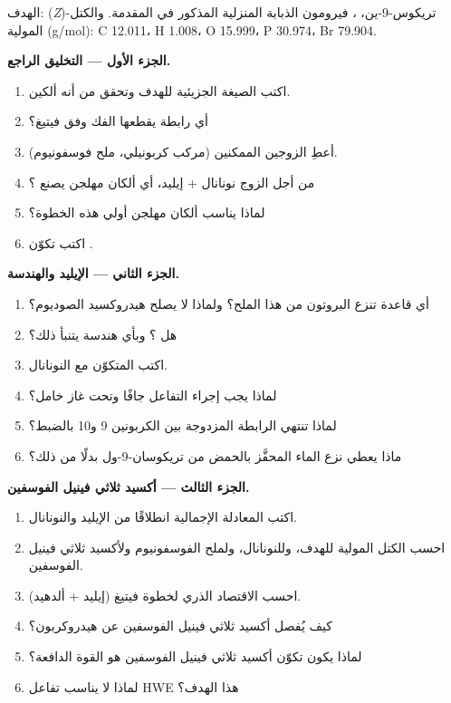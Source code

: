 \begin{problem}
\label{pb:b2:wittig:1}
الهدف: (\textit{Z})-تريكوس-9-ين، ، فيرومون الذبابة المنزلية المذكور في
المقدمة. والكتل المولية (\unit{g/mol}): C 12.011، H 1.008، O 15.999، P 30.974، Br 79.904.

\medskip
\noindent\textbf{الجزء الأول --- التخليق الراجع.}
\begin{enumerate}
  \item اكتب الصيغة الجزيئية للهدف وتحقق من أنه ألكين.
  \item أي رابطة يقطعها الفك وفق فيتيغ؟
  \item أعطِ الزوجين الممكنين (مركب كربونيلي، ملح فوسفونيوم).
  \item من أجل الزوج نونانال + إيليد، أي ألكان مهلجن يصنع ؟
  \item لماذا يناسب ألكان مهلجن أولي هذه الخطوة؟
  \item اكتب تكوّن .
\end{enumerate}

\medskip
\noindent\textbf{الجزء الثاني --- الإيليد والهندسة.}
\begin{enumerate}[resume]
  \item أي قاعدة تنزع البروتون من هذا الملح؟ ولماذا لا يصلح هيدروكسيد الصوديوم؟
  \item هل ؟ وبأي هندسة يتنبأ ذلك؟
  \item اكتب  المتكوّن مع النونانال.
  \item لماذا يجب إجراء التفاعل جافًا وتحت غاز خامل؟
  \item لماذا تنتهي الرابطة المزدوجة بين الكربونين 9 و10 بالضبط؟
  \item ماذا يعطي نزع الماء المحفَّز بالحمض من تريكوسان-9-ول بدلًا من ذلك؟
\end{enumerate}

\medskip
\noindent\textbf{الجزء الثالث --- أكسيد ثلاثي فينيل الفوسفين.}
\begin{enumerate}[resume]
  \item اكتب المعادلة الإجمالية انطلاقًا من الإيليد والنونانال.
  \item احسب الكتل المولية للهدف، وللنونانال، ولملح الفوسفونيوم ولأكسيد
        ثلاثي فينيل الفوسفين.
  \item احسب الاقتصاد الذري لخطوة فيتيغ (إيليد + ألدهيد).
  \item كيف يُفصل أكسيد ثلاثي فينيل الفوسفين عن هيدروكربون؟
  \item لماذا يكون تكوّن أكسيد ثلاثي فينيل الفوسفين هو القوة الدافعة؟
  \item لماذا لا يناسب تفاعل HWE هذا الهدف؟
\end{enumerate}


\end{problem}
